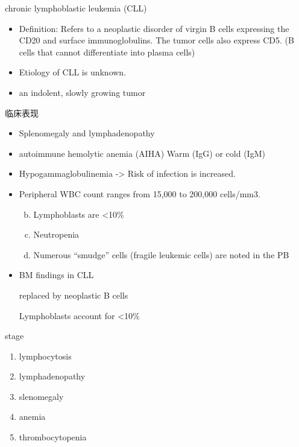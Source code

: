 \documentclass[
  ignorenonframetext,
]{beamer}
\begin{document}
\begin{frame}
\begin{block}{chronic lymphoblastic leukemia (CLL)}
\protect\hypertarget{chronic-lymphoblastic-leukemia-cll}{}
\begin{itemize}
\item
  Definition: Refers to a neoplastic disorder of virgin B cells
  expressing the CD20 and surface immunoglobulins. The tumor cells also
  express CD5. (B cells that cannot differentiate into plasma cells)
\item
  Etiology of CLL is unknown.
\item
  an indolent, slowly growing tumor
\end{itemize}
\end{block}
\end{frame}

\begin{frame}
\begin{block}{临床表现}
\protect\hypertarget{ux4e34ux5e8aux8868ux73b0-8}{}
\begin{itemize}
\item
  Splenomegaly and lymphadenopathy
\item
  autoimmune hemolytic anemia (AIHA) Warm (IgG) or cold (IgM)
\item
  Hypogammaglobulinemia -\textgreater{} Risk of infection is increased.
\item
  Peripheral WBC count ranges from 15,000 to 200,000 cells/mm3.

  \begin{enumerate}
  [a.]
  \setcounter{enumi}{1}
  \item
    Lymphoblasts are \textless10\%
  \item
    Neutropenia
  \item
    Numerous ``smudge'' cells (fragile leukemic cells) are noted in the
    PB
  \end{enumerate}
\item
  BM findings in CLL

  replaced by neoplastic B cells

  Lymphoblasts account for \textless10\%
\end{itemize}
\end{block}
\end{frame}

\begin{frame}
\begin{block}{stage}
\protect\hypertarget{stage}{}
\begin{enumerate}
\item
  lymphocytosis
\item
  lymphadenopathy
\item
  slenomegaly
\item
  anemia
\item
  thrombocytopenia
\end{enumerate}
\end{block}
\end{frame}
\end{document}

